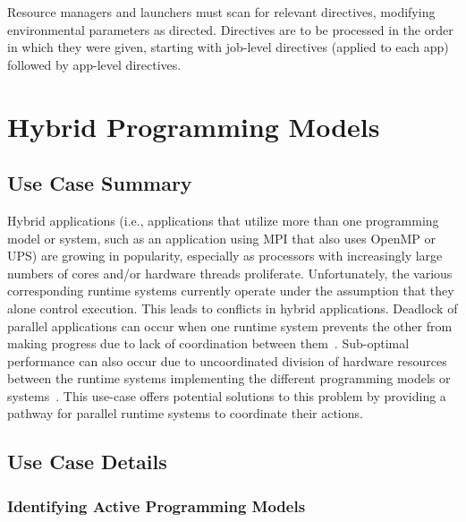 


Resource managers and launchers must scan for relevant directives, modifying environmental parameters as directed. Directives are to be processed in the order in which they were given, starting with job-level directives (applied to each app) followed by app-level directives.

\section{Hybrid Programming Models}
\label{app:uc-hybrid-programming-models}

\subsection{Use Case Summary}

Hybrid applications (i.e., applications that utilize more than one programming model or system, such as an application using MPI that also uses OpenMP or UPS) are growing in popularity, especially as processors with increasingly large numbers of cores and/or hardware threads proliferate. Unfortunately, the various corresponding runtime systems currently operate under the assumption that they alone control execution. This leads to conflicts in hybrid applications. Deadlock of parallel applications can occur when one runtime system prevents the other from making progress due to lack of coordination between them~\cite{2016:Hamidouche}. Sub-optimal performance can also occur due to uncoordinated division of hardware resources between the runtime systems implementing the different programming models or systems~\cite{ompix-moc,2018:Vallee}. This use-case offers potential solutions to this
problem by providing a pathway for parallel runtime systems to coordinate their actions.

\subsection{Use Case Details}

\subsubsection{Identifying Active Programming Models}

